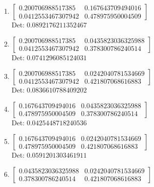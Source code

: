 \documentclass[12pt]{article}
\begin{document}
\begin{enumerate}

\item $\displaystyle \left[\begin{matrix}0.200706988517385 & 0.167643709494016\\0.0412553467307942 & 0.478975950004509\end{matrix}\right]$\\

Det: $0.0892176211352467$\\

\item $\displaystyle \left[\begin{matrix}0.200706988517385 & 0.0435823036325988\\0.0412553467307942 & 0.378300786240514\end{matrix}\right]$\\

Det: $0.0741296085124031$\\

\item $\displaystyle \left[\begin{matrix}0.200706988517385 & 0.0242040781534669\\0.0412553467307942 & 0.421807068616883\end{matrix}\right]$\\

Det: $0.0836610788409202$\\

\item $\displaystyle \left[\begin{matrix}0.167643709494016 & 0.0435823036325988\\0.478975950004509 & 0.378300786240514\end{matrix}\right]$\\

Det: $0.0425448718240536$\\

\item $\displaystyle \left[\begin{matrix}0.167643709494016 & 0.0242040781534669\\0.478975950004509 & 0.421807068616883\end{matrix}\right]$\\

Det: $0.0591201303461911$\\

\item $\displaystyle \left[\begin{matrix}0.0435823036325988 & 0.0242040781534669\\0.378300786240514 & 0.421807068616883\end{matrix}\right]$\\


\end{enumerate}
\end{document}
